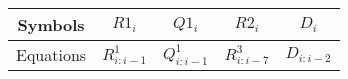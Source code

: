 \begin{table}[H]
\centering
    \begin{tabular}{|| c || c | c | c | c ||} 
    \hline
    Symbols & $R1_i$ & $Q1_i$ & $R2_i$ & $D_i$ \\
    \hline
    Equations & $R^1_{i:i-1}$ & $Q^1_{i:i-1}$ & $R^3_{i:i-7}$ &$ D_{i:i-2}$ \\
    \hline
    \end{tabular}
\end{table}     










